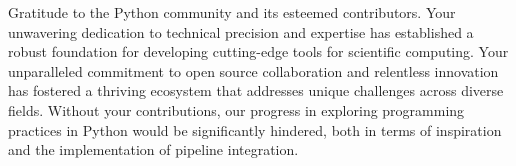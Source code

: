 \documentclass[a4paper,12pt]{article}
\begin{document}
Gratitude to the Python community and its esteemed contributors. Your unwavering dedication to technical precision and expertise has established a robust foundation for developing cutting-edge tools for scientific computing. Your unparalleled commitment to open source collaboration and relentless innovation has fostered a thriving ecosystem that addresses unique challenges across diverse fields. Without your contributions, our progress in exploring programming practices in Python would be significantly hindered, both in terms of inspiration and the implementation of pipeline integration.\par

\clearpage



\end{document}
